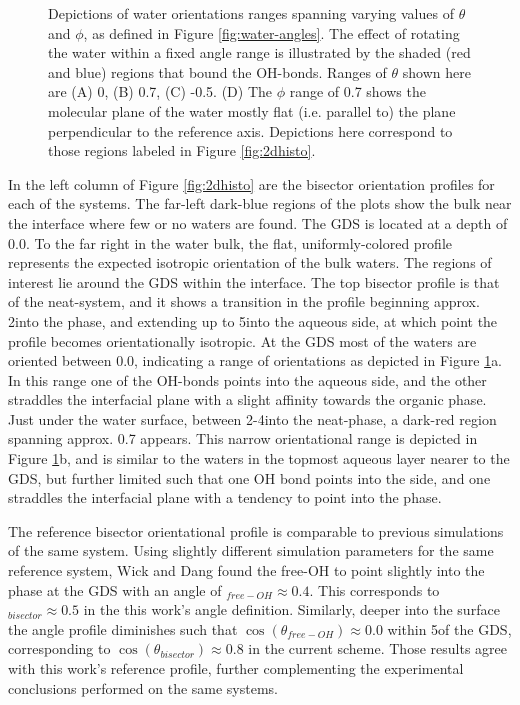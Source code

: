 \begin{figure}[h!]
\begin{center}
	\caption{Depictions of water orientations ranges spanning varying values of $\theta$ and $\phi$, as defined in Figure \ref{fig:water-angles}. The effect of rotating the water within a fixed angle range is illustrated by the shaded (red and blue) regions that bound the OH-bonds. Ranges of $\theta$ shown here are (A) 0, (B) 0.7, (C) -0.5. (D) The $\phi$ range of 0.7 shows the molecular plane of the water mostly flat (i.e. parallel to) the plane perpendicular to the reference axis. Depictions here correspond to those regions labeled in Figure \ref{fig:2dhisto}.}
	\label{fig:angle-ranges}
\end{center}
\end{figure}

In the left column of Figure \ref{fig:2dhisto} are the bisector orientation profiles for each of the systems. The far-left dark-blue regions of the plots show the \ctc bulk near the interface where few or no waters are found. The GDS is located at a depth of 0.0\angs. To the far right in the water bulk, the flat, uniformly-colored profile represents the expected isotropic orientation of the bulk waters. The regions of interest lie around the GDS within the interface. The top bisector profile is that of the neat-\ctcwat system, and it shows a transition in the profile beginning approx. 2\angs into the \ctc phase, and extending up to 5\angs into the aqueous side, at which point the profile becomes orientationally isotropic. At the GDS most of the waters are oriented between 0.0, indicating a range of orientations as depicted in Figure \ref{fig:angle-ranges}a. In this range one of the OH-bonds points into the aqueous side, and the other straddles the interfacial plane with a slight affinity towards the organic \ctc phase. Just under the water surface, between 2-4\angs into the neat-\wat phase, a dark-red region spanning approx. 0.7 appears. This narrow orientational range is depicted in Figure \ref{fig:angle-ranges}b, and is similar to the waters in the topmost aqueous layer nearer to the GDS, but further limited such that one OH bond points into the \wat side, and one straddles the interfacial plane with a tendency to point into the \wat phase.

The reference \ctcwat bisector orientational profile is comparable to previous simulations of the same system. Using slightly different simulation parameters for the same reference \ctcwat system, Wick and Dang found the free-OH to point slightly into the \ctc phase at the GDS with an angle of \costheta$_{free-OH}\approx 0.4$.\cite{Wick2006c} This corresponds to \costheta$_{bisector} \approx 0.5$ in the this work's angle definition. Similarly, deeper into the surface the angle profile diminishes such that $\cos(\theta_{free-OH})\approx 0.0$ within 5\angs of the GDS, corresponding to $\cos(\theta_{bisector})\approx 0.8$ in the current scheme. Those results agree with this work's reference \ctcwat profile, further complementing the experimental conclusions performed on the same systems.\cite{McFearin2009,Scatena2001}

